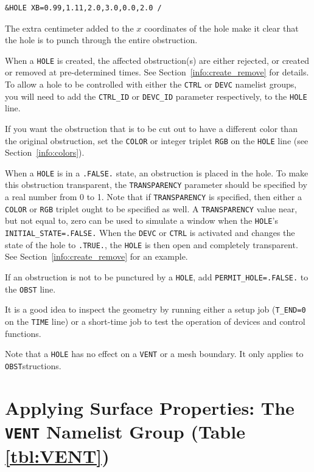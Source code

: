\documentclass[11pt]{book}
\newcommand{\ct}{\tt\small}
\begin{document}
\footnotesize
\begin{verbatim}
&HOLE XB=0.99,1.11,2.0,3.0,0.0,2.0 /
\end{verbatim}
\normalsize
The extra centimeter added to the $x$ coordinates of the hole make it clear
that the hole is to punch through the entire obstruction.

When a {\ct HOLE} is created, the affected obstruction(s) are either rejected, or
created or removed at pre-determined times. See Section~\ref{info:create_remove} for details.
To allow a hole to be controlled with either the {\ct CTRL} or {\ct DEVC} namelist groups, you will need to add the {\ct CTRL\_ID} or {\ct DEVC\_ID}
parameter respectively, to the {\ct HOLE} line.

If you want the obstruction that is to be cut out to have a different color
than the original obstruction, set the {\ct COLOR} or integer triplet
{\ct RGB} on the {\ct HOLE} line (see Section~\ref{info:colors}).

When a {\ct HOLE} is in a {\ct .FALSE.} state, an obstruction is placed in the hole.
To make this obstruction transparent, the {\ct TRANSPARENCY} parameter should be specified by
a real number from 0 to 1. Note that if {\ct TRANSPARENCY} is specified, then either a {\ct COLOR} or {\ct RGB} triplet ought to be specified as well.
A {\ct TRANSPARENCY} value near, but not equal to, zero can be used to simulate a window when the {\ct HOLE}'s {\ct INITIAL\_STATE=.FALSE.} When the {\ct DEVC} or {\ct CTRL}
is activated and changes the state of the hole to {\ct .TRUE.}, the {\ct HOLE} is then open and completely transparent.
See Section~\ref{info:create_remove} for an example.

If an obstruction is not to be punctured by a {\ct HOLE}, add
{\ct PERMIT\_HOLE=.FALSE.} to the {\ct OBST} line.

\begin{warning}
\noindent
It is a good idea to inspect the geometry by running either a setup job
({\ct T\_END=0} on the {\ct TIME} line) or a short-time job to test the operation of devices and control functions.
\end{warning}

\begin{warning}
\noindent
Note that a {\ct HOLE} has no effect on a {\ct VENT} or a mesh boundary. It only applies to {\ct OBST}structions.
\end{warning}


\newpage

\section{Applying Surface Properties: The \texorpdfstring{{\tt VENT}}{VENT} Namelist Group (Table \ref{tbl:VENT})}
\label{info:VENT}
\end{document}
